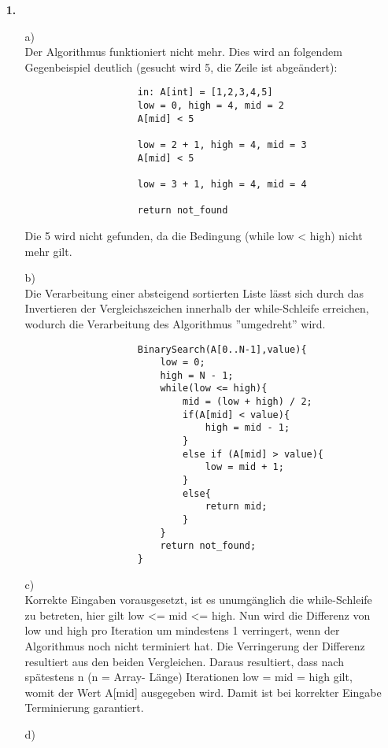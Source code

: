 \documentclass[a4paper,11pt,ngerman]{scrartcl}
\title{\titleinfo}
\author{\authorinfo}
\begin{document}
	\maketitle
	\begin{enumerate}
		\item[\textbf{1.}]
		\begin{enumerate}
			\item[a)]\quad \\
				Der Algorithmus funktioniert nicht mehr. Dies wird an folgendem Gegenbeispiel deutlich 
				(gesucht wird 5, die Zeile ist abgeändert):
				\begin{verbatim}
					in: A[int] = [1,2,3,4,5]
					low = 0, high = 4, mid = 2
					A[mid] < 5
					
					low = 2 + 1, high = 4, mid = 3
					A[mid] < 5
					
					low = 3 + 1, high = 4, mid = 4
					
					return not_found
				\end{verbatim}
				Die 5 wird nicht gefunden, da die Bedingung (while low < high) nicht mehr gilt.
			\item[b)]\quad \\
				Die Verarbeitung einer absteigend sortierten Liste lässt sich durch das Invertieren der 
				Vergleichszeichen innerhalb der while-Schleife erreichen, wodurch die Verarbeitung des 
				Algorithmus ''umgedreht'' wird.
				\begin{verbatim}
					BinarySearch(A[0..N-1],value){
					    low = 0;
					    high = N - 1;
					    while(low <= high){
					        mid = (low + high) / 2;
					        if(A[mid] < value){
					            high = mid - 1;
					        }
					        else if (A[mid] > value){
				    	        low = mid + 1;
					        }
					        else{
					            return mid;
					        }
					    }
					    return not_found;
					}
				\end{verbatim}
			\item[c)]\quad \\
				Korrekte Eingaben vorausgesetzt, ist es unumgänglich die while-Schleife zu betreten,
				hier gilt low <= mid <= high. Nun wird die Differenz von low und high pro Iteration um mindestens
				1 verringert, wenn der Algorithmus noch nicht terminiert hat. Die Verringerung der Differenz 
				resultiert aus den beiden Vergleichen. Daraus resultiert, dass nach spätestens n (n  = Array-
				Länge) Iterationen low = mid = high gilt, womit der Wert A[mid] ausgegeben wird. Damit ist bei
				korrekter Eingabe Terminierung garantiert.
			\item[d)]\quad \\
				

\end{enumerate}
\end{enumerate}
\end{document}
